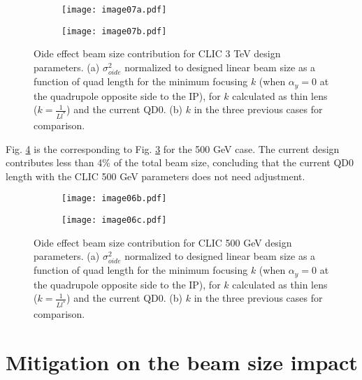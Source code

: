 \begin{figure}[tbh]
\centering
\begin{subfigure}{1.0\textwidth}
\centering
\texttt{[image: image07a.pdf]}\caption{}\label{fig-3TeV:a}
\end{subfigure}\par
\begin{subfigure}{1.0\textwidth}
\centering
\texttt{[image: image07b.pdf]}\caption{}\label{fig-3TeV:b}
\end{subfigure}
\caption{Oide effect beam size contribution for CLIC 3 TeV design parameters. (a) $\sigma^2_{oide}$ normalized to designed linear beam size as a function of quad length for the minimum focusing $k$ (when $\alpha_y=0$ at the quadrupole opposite side to the IP), for $k$ calculated as thin lens ($k=\frac{1}{Ll^*}$) and the current QD0. (b) $k$ in the three previous cases for comparison.}\label{fig-3TeV}
 \end{figure}\par
Fig. \ref{fig-500GeV} is the corresponding to Fig. \ref{fig-3TeV} for the 500 GeV case. The current design contributes less than 4\% of the total beam size, concluding that the current QD0 length with the CLIC 500 GeV parameters does not need adjustment.\par
\begin{figure}[htb]
\centering
\begin{subfigure}{1.0\textwidth}
\centering
\texttt{[image: image06b.pdf]}\caption{}
\end{subfigure}
\begin{subfigure}{1.0\textwidth}
\centering
\texttt{[image: image06c.pdf]}\caption{}
\end{subfigure}
\caption{Oide effect beam size contribution for CLIC 500 GeV design parameters. (a) $\sigma^2_{oide}$ normalized to designed linear beam size as a function of quad length for the minimum focusing $k$ (when $\alpha_y=0$ at the quadrupole opposite side to the IP), for $k$ calculated as thin lens ($k=\frac{1}{Ll^*}$) and the current QD0. (b) $k$ in the three previous cases for comparison.}\label{fig-500GeV}
 \end{figure}\par
 
\section{Mitigation on the beam size impact}
